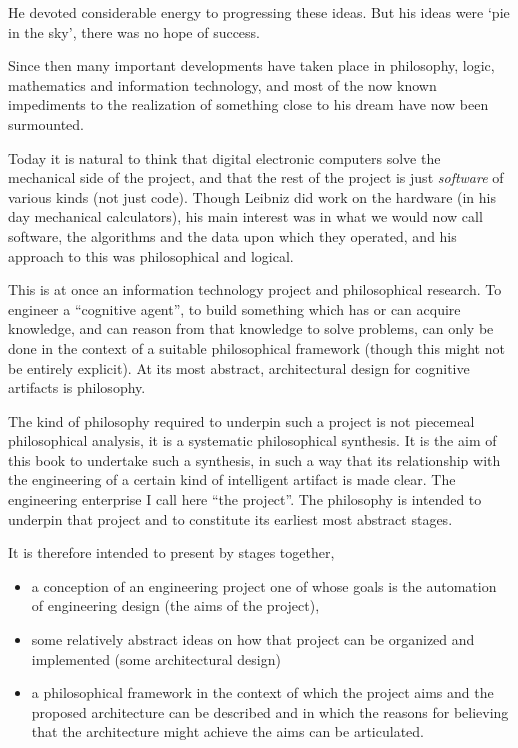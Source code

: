 He devoted considerable energy to progressing these ideas.
But his ideas were `pie in the sky', there was no hope of success.

Since then many important developments have taken place in philosophy,
logic, mathematics and information technology, and most of the now known
impediments to the realization of something close to his dream have
now been surmounted.

Today it is natural to think that digital electronic computers solve the mechanical side
of the project, and that the rest of the project is just {\it software} of
various kinds (not just code).
Though Leibniz did work on the hardware (in his day mechanical
calculators), his main interest was in what we would now call software,
the algorithms and the data upon which they operated, and his approach
to this was philosophical and logical.
 
This is at once an information technology project and philosophical research.
To engineer a ``cognitive agent'', to build something which has or can
acquire knowledge, and can reason from that knowledge to solve
problems, can only be done in the context of a suitable philosophical
framework (though this might not be entirely explicit).
At its most abstract, architectural design for cognitive artifacts is
philosophy.

The kind of philosophy required to underpin such a project is not
piecemeal philosophical analysis, it is a systematic philosophical
synthesis.
It is the aim of this book to undertake such a synthesis, in such a
way that its relationship with the engineering of a certain kind of
intelligent artifact is made clear.
The engineering enterprise I call here ``the project''.
The philosophy is intended to underpin that project and to constitute
its earliest most abstract stages.

It is therefore intended to present by stages together,
\begin{itemize}
\item a conception of an engineering project one of whose goals is the
  automation of engineering design (the aims of the project),
\item some relatively abstract ideas on how that project can be
  organized and implemented (some architectural design)
\item a philosophical framework in the context of which the project
  aims and the proposed architecture can be described and in which the
  reasons for believing that the architecture might achieve the aims
  can be articulated.
\end{itemize}

